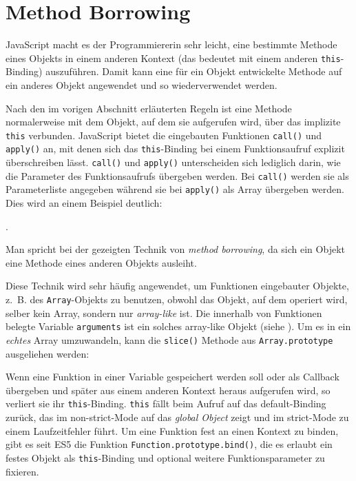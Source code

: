 
\section{Method Borrowing}

JavaScript macht es der Programmiererin sehr leicht, eine bestimmte Methode eines Objekts in einem anderen Kontext (das bedeutet mit einem anderen \texttt{this}-Binding) auszuführen. Damit kann eine für ein Objekt entwickelte Methode auf ein anderes Objekt angewendet und so wiederverwendet werden. 

Nach den im vorigen Abschnitt erläuterten Regeln ist eine Methode normalerweise mit dem Objekt, auf dem sie aufgerufen wird, über das implizite \texttt{this} verbunden. JavaScript bietet die eingebauten Funktionen \texttt{call()} und \texttt{apply()} an, mit denen sich das \texttt{this}-Binding bei einem Funktionsaufruf explizit überschreiben lässt. \texttt{call()} und \texttt{apply()} unterscheiden sich lediglich darin, wie die Parameter des Funktionsaufrufs übergeben werden. Bei \texttt{call()} werden sie als Parameterliste angegeben während sie bei \texttt{apply()} als Array übergeben werden.
Dies wird an einem Beispiel deutlich:

.

Man spricht bei der gezeigten Technik von \emph{method borrowing}, da sich ein Objekt eine Methode eines anderen Objekts ausleiht.

Diese Technik wird sehr häufig angewendet, um Funktionen eingebauter Objekte,  z.~B. des \texttt{Array}-Objekts zu benutzen, obwohl das Objekt, auf dem operiert wird, selber kein Array, sondern nur \emph{array-like} ist. Die innerhalb von Funktionen belegte Variable \texttt{arguments} ist ein solches array-like Objekt (siehe \citep{MozillaDeveloperNetworkargumentsobject}). Um es in ein \emph{echtes} Array umzuwandeln, kann die \texttt{slice()} Methode aus \texttt{Array.prototype} ausgeliehen werden:

Wenn eine Funktion in einer Variable gespeichert werden soll oder als Callback übergeben und später aus einem anderen Kontext heraus aufgerufen wird, so verliert sie ihr \texttt{this}-Binding. \texttt{this} fällt beim Aufruf auf das default-Binding zurück, das im non-strict-Mode auf das \emph{global Object} zeigt und im strict-Mode zu einem Laufzeitfehler führt. Um eine Funktion fest an einen Kontext zu binden, gibt es seit ES5 die Funktion \texttt{Function.prototype.bind()}, die es erlaubt ein festes Objekt als \texttt{this}-Binding und optional weitere Funktionsparameter zu fixieren.

